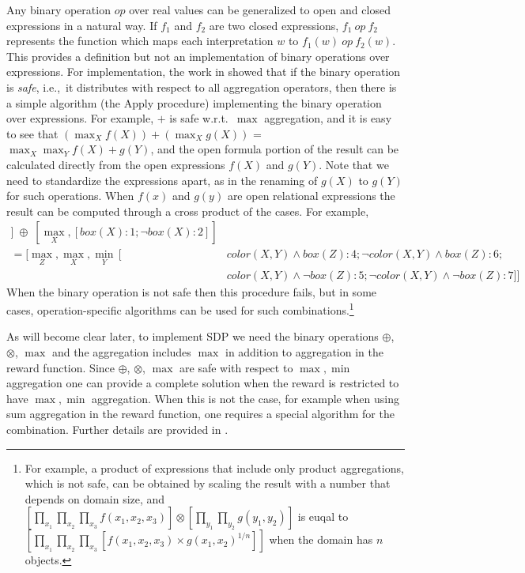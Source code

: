 Any binary operation $op$ over real values can be generalized to open
and closed expressions in a natural way. If $f_1$ and $f_2$ are two
closed expressions, $f_1\ op\ f_2$ represents the function which maps
each interpretation $w$ to $f_1(w)\ op\ f_2(w)$.
%
%
%
%
%
%
%
%
%
This provides a definition but not an implementation of binary
operations over expressions.  
%
%
%
%
%
%
%
%
%
%
%
%
%
%
For implementation,
the work in \cite{JoshiKeKh11} showed that if the binary operation is
{\em safe}, i.e.,\ it distributes with respect to all aggregation
operators, then there is a simple algorithm (the Apply procedure)
implementing the binary operation over expressions.  For example, $+$
is safe w.r.t.\ $\max$ aggregation, and it is easy to see that
$(\max_X f(X)) + (\max_X g(X))$ = $\max_X \max_Y f(X)+ g(Y)$, and the
open formula portion of the result can be calculated directly from the
open expressions $f(X)$ and $g(Y)$.  
Note that we need to standardize
the expressions apart, as in the renaming of $g(X)$ to $g(Y)$ for such
operations. 
When $f(x)$ and $g(y)$
are open relational expressions
the result can be computed through a cross product of the cases. 
For example,
\begin{align*}
[\max_{X}, \min_{Y} \, [color & (X,Y) :3; \neg color(X,Y):5]] \; \oplus \;
[\max_{X}, [box(X):1; \neg box(X):2]] 
\\
= [\max_Z, \max_{X}, \min_{Y} \, [& color(X,Y)\wedge box(Z):4; \neg color(X,Y)\wedge box(Z):6; 
\\
& color(X,Y)\wedge \neg box(Z):5; \neg color(X,Y)\wedge \neg box(Z):7]]
\end{align*}
When the binary operation is not safe then this procedure
fails, but in some cases, operation-specific algorithms can be
used for such combinations.\footnote{For example, a product of expressions that include only product aggregations, which is not safe, can be obtained by scaling the result with a number that depends on domain size, and 
$[\prod_{x_1} \prod_{x_2} \prod_{x_3} f(x_1,x_2,x_3)] 
\otimes
[\prod_{y_1} \prod_{y_2} g(y_1,y_2)]$ is euqal to 
$
[\prod_{x_1} \prod_{x_2} \prod_{x_3} 
[f(x_1,x_2,x_3)
\times g(x_1,x_2)^{1/n} ] ]
$ when the domain has $n$ objects.
}

As will become clear later, to implement SDP we need the binary
operations $\oplus$, $\otimes$, $\max$ and the aggregation includes
$\max$ in addition to aggregation in the reward function.  Since
$\oplus$, $\otimes$, $\max$ are safe with respect to $\max,\min$
aggregation one can provide a complete solution 
when the reward is restricted to have $\max,\min$ aggregation. 
When this is not the case, for example when using sum aggregation in the
reward function,  one requires a special algorithm for the
combination. Further details are provided in \cite{JoshiKeKh11,JoshiKhRaTaFe13}.

